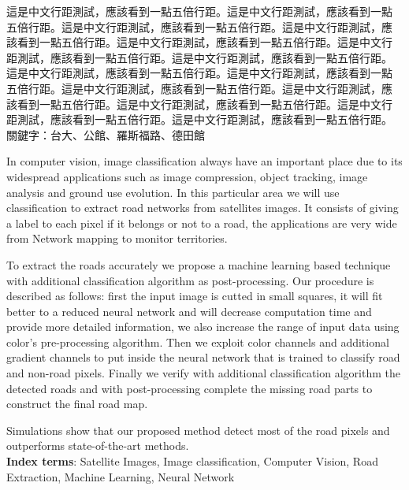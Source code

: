 \begin{abstractzh}
這是中文行距測試，應該看到一點五倍行距。這是中文行距測試，應該看到一點
五倍行距。這是中文行距測試，應該看到一點五倍行距。這是中文行距測試，應
該看到一點五倍行距。這是中文行距測試，應該看到一點五倍行距。這是中文行
距測試，應該看到一點五倍行距。這是中文行距測試，應該看到一點五倍行距。
這是中文行距測試，應該看到一點五倍行距。這是中文行距測試，應該看到一點
五倍行距。這是中文行距測試，應該看到一點五倍行距。這是中文行距測試，應
該看到一點五倍行距。這是中文行距測試，應該看到一點五倍行距。這是中文行
距測試，應該看到一點五倍行距。這是中文行距測試，應該看到一點五倍行距。 \\

\noindent
關鍵字：台大、公館、羅斯福路、德田館
\end{abstractzh}

\begin{abstracten}
In computer vision, image classification always have an important place due to its widespread applications such as image compression, object tracking, image analysis and ground use evolution. In this particular area we will use classification to extract road networks from satellites images. It consists of giving a label to each pixel if it belongs or not to a road, the applications are very wide from Network mapping to monitor territories.

To extract the roads accurately we propose a machine learning based technique with additional classification algorithm as post-processing. Our procedure is described as follows: first the input image is cutted in small squares, it will fit better to a reduced neural network and will decrease computation time and provide more detailed information, we also increase the range of input data using color’s pre-processing algorithm. Then we exploit color channels and additional gradient channels to put inside the neural network that is trained to classify road and non-road pixels. Finally we verify with additional classification algorithm the detected roads and with post-processing complete the missing road parts to construct the final road map.

Simulations show that our proposed method detect most of the road pixels and outperforms state-of-the-art methods.\\

\noindent
\textbf{Index terms}: Satellite Images, Image classification, Computer Vision, Road Extraction, Machine Learning, Neural Network
\end{abstracten}
